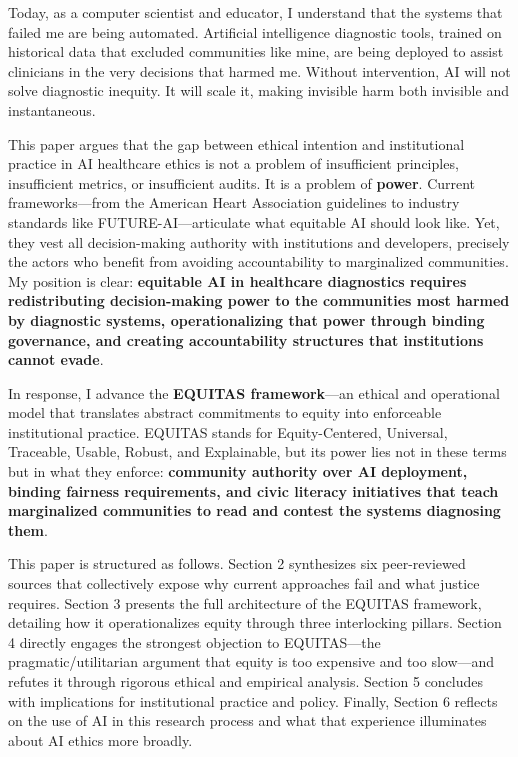 \documentclass[12pt,a4paper]{article}
\begin{document}
Today, as a computer scientist and educator, I understand that the systems that failed me are being automated. Artificial intelligence diagnostic tools, trained on historical data that excluded communities like mine, are being deployed to assist clinicians in the very decisions that harmed me. Without intervention, AI will not solve diagnostic inequity. It will scale it, making invisible harm both invisible and instantaneous.

This paper argues that the gap between ethical intention and institutional practice in AI healthcare ethics is not a problem of insufficient principles, insufficient metrics, or insufficient audits. It is a problem of \textbf{power}. Current frameworks---from the American Heart Association guidelines to industry standards like FUTURE-AI---articulate what equitable AI should look like. Yet, they vest all decision-making authority with institutions and developers, precisely the actors who benefit from avoiding accountability to marginalized communities. My position is clear: \textbf{equitable AI in healthcare diagnostics requires redistributing decision-making power to the communities most harmed by diagnostic systems, operationalizing that power through binding governance, and creating accountability structures that institutions cannot evade}.

In response, I advance the \textbf{EQUITAS framework}---an ethical and operational model that translates abstract commitments to equity into enforceable institutional practice. EQUITAS stands for Equity-Centered, Universal, Traceable, Usable, Robust, and Explainable, but its power lies not in these terms but in what they enforce: \textbf{community authority over AI deployment, binding fairness requirements, and civic literacy initiatives that teach marginalized communities to read and contest the systems diagnosing them}.

This paper is structured as follows. Section 2 synthesizes six peer-reviewed sources that collectively expose why current approaches fail and what justice requires. Section 3 presents the full architecture of the EQUITAS framework, detailing how it operationalizes equity through three interlocking pillars. Section 4 directly engages the strongest objection to EQUITAS---the pragmatic/utilitarian argument that equity is too expensive and too slow---and refutes it through rigorous ethical and empirical analysis. Section 5 concludes with implications for institutional practice and policy. Finally, Section 6 reflects on the use of AI in this research process and what that experience illuminates about AI ethics more broadly.
\end{document}
